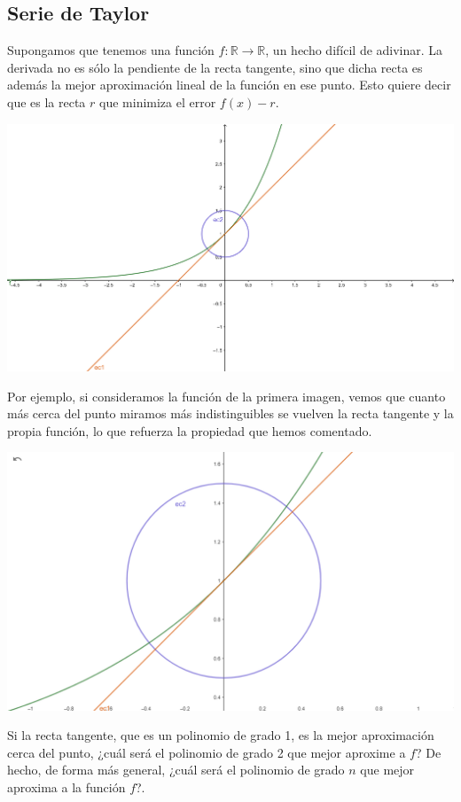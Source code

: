 \documentclass[10pt,a4paper,openright]{book}
\theoremstyle{break}
\begin{document}
\subsection{Serie de Taylor}
Supongamos que tenemos una función $f:\mathbb R\rightarrow \mathbb R$, un hecho difícil de adivinar. La derivada no es sólo la pendiente de la recta tangente, sino que dicha recta es además la mejor aproximación lineal de la función en ese punto. Esto quiere decir que es la recta $r$ que minimiza el error $f(x) - r$.
\begin{center}
\includegraphics[scale=0.9]{polinomio de taylor 1}
\end{center}
Por ejemplo, si consideramos la función de la primera imagen, vemos que cuanto más cerca del punto miramos más indistinguibles se vuelven la recta tangente y la propia función, lo que refuerza la propiedad que hemos comentado.
\begin{center}
\includegraphics[scale=0.25]{de taylor 2}
\end{center}

Si la recta tangente, que es un polinomio de grado 1, es la mejor aproximación cerca del punto, ¿cuál será el polinomio de grado 2 que mejor aproxime a $f$? De hecho, de forma más general, ¿cuál será el polinomio de grado $n$ que mejor aproxima a la función $f$?.
\end{document}
